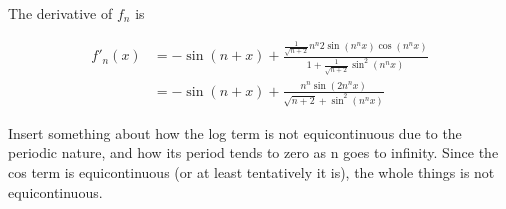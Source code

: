 \documentclass{article}
\begin{document}
The derivative of $f_n$ is

\begin{align*}
f'_n(x) &= -\sin(n+x) +
\frac{
\frac{1}{\sqrt{n+2}}n^n 2 \sin(n^n x) \cos(n^n x)
}{
1 + \frac{1}{\sqrt{n+2}} \sin^2(n^n x)
} \\
&= -\sin(n+x) +
\frac{
n^n \sin(2n^n x)
}{
\sqrt{n+2} + \sin^2(n^n x)
}
\end{align*}

Insert something about how the log term is not equicontinuous due to the periodic nature, and how its period tends to zero as n goes to infinity. Since the cos term is equicontinuous (or at least tentatively it is), the whole things is not equicontinuous.
\end{document}
